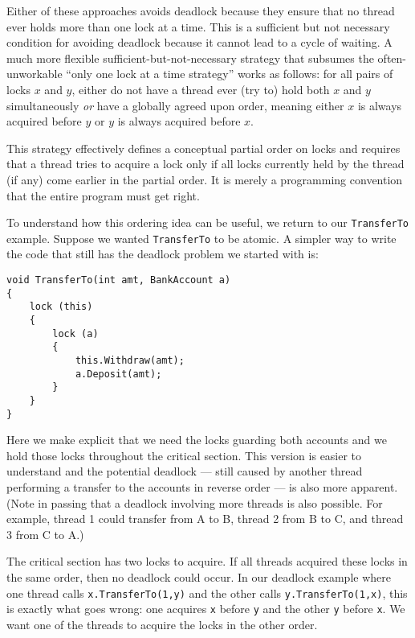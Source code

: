\documentclass[10pt]{article}
\begin{document}
Either of these approaches avoids deadlock because they ensure that no
thread ever holds more than one lock at a time.  This is a sufficient
but not necessary condition for avoiding deadlock because it cannot
lead to a cycle of waiting.  A much more flexible
sufficient-but-not-necessary strategy that subsumes the
often-unworkable ``only one lock at a time strategy'' works as
follows: for all pairs of locks $x$ and $y$, either do not have a
thread ever (try to) hold both $x$ and $y$ simultaneously \emph{or}
have a globally agreed upon order, meaning either $x$ is always
acquired before $y$ or $y$ is always acquired before $x$.

This strategy effectively defines a conceptual partial order on locks
and requires that a thread tries to acquire a lock only if all locks
currently held by the thread (if any) come earlier in the partial
order.  It is merely a programming convention that the entire program
must get right.

To understand how this ordering idea can be useful, we return to our
{\tt TransferTo} example.  Suppose we wanted {\tt TransferTo} to be
atomic.  A simpler way to write the code that still has the deadlock
problem we started with is:
\begin{verbatim}
void TransferTo(int amt, BankAccount a)
{
    lock (this)
    {
        lock (a)
        {
            this.Withdraw(amt);
            a.Deposit(amt);
        }
    }
}
\end{verbatim}
Here we make explicit that we need the locks guarding both accounts
and we hold those locks throughout the critical section.  This version
is easier to understand and the potential deadlock --- still caused by
another thread performing a transfer to the accounts in reverse order
--- is also more apparent.  (Note in passing that a deadlock involving
more threads is also possible.  For example, thread 1 could transfer
from A to B, thread 2 from B to C, and thread 3 from C to A.)

The critical section has two locks to acquire.  If all threads
acquired these locks in the same order, then no deadlock could occur.  In
our deadlock example where one thread calls {\tt x.TransferTo(1,y)}
and the other calls {\tt y.TransferTo(1,x)}, this is exactly what goes
wrong: one acquires {\tt x} before {\tt y} and the other {\tt y}
before {\tt x}.  We want one of the threads to acquire the locks in
the other order.
\end{document}
